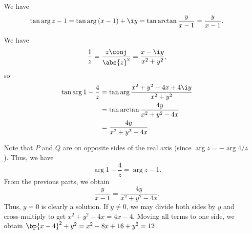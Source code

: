 \begin{solution}
    \begin{ppart}
        We have \[\tan{\arg{z-1}} = \tan{\arg{(x-1) + \i y}} = \tan \arctan{\frac{y}{x-1}} = \frac{y}{x-1}.\]
    \end{ppart}
    \begin{ppart}
        We have \[\frac{1}{z} = \frac{z\conj}{\abs{z}^2} = \frac{x - \i y}{x^2 + y^2},\] so
        \begin{align*}
            \tan{\arg{1 - \frac4z}} &= \tan{\arg{\frac{x^2 + y^2 - 4x + 4\i y}{x^2 + y^2}}}\\
            &= \tan \arctan{\frac{4y}{x^2 + y^2 - 4x}}\\
            &= \frac{4y}{x^2 + y^2 - 4x}.
        \end{align*}
    \end{ppart}
    \begin{ppart}
        Note that $P$ and $Q$ are on opposite sides of the real axis (since $\arg{z} = -\arg{4/z}$). Thus, we have \[\arg{1 - \frac4z} = \arg{z-1}.\] From the previous parts, we obtain \[\frac{y}{x - 1} = \frac{4y}{x^2 + y^2 - 4x}.\] Thus, $y = 0$ is clearly a solution. If $y \neq 0$, we may divide both sides by $y$ and cross-multiply to get $x^2 + y^2 - 4x = 4x - 4$. Moving all terms to one side, we obtain $\bp{x - 4}^2 + y^2 = x^2 - 8x + 16 + y^2 = 12$.

        \begin{center}
\end{center}
\end{ppart}
\end{solution}
